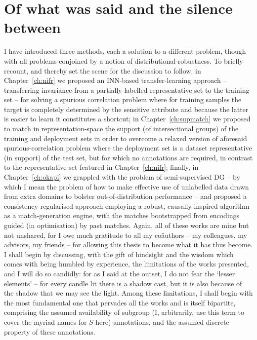 \section*{Of what was said and the silence between}\label{sec:what-was-said}
%
I have introduced three methods, each a solution to a different problem, though with all problems
conjoined by a notion of distributional-robustness.
%
%
To briefly recount, and thereby set the scene for the discussion to follow: in
Chapter~\ref{ch:nifr} we proposed an \ac{INN}-based transfer-learning approach -- transferring
invariance from a partially-labelled representative set to the training set -- for solving a
spurious correlation problem where for training samples the target is completely determined by the
sensitive attribute and because the latter is easier to learn it constitutes a shortcut;
%
in Chapter~\ref{ch:supmatch} we proposed to match in representation-space the support (of
intersectional groups) of the training and deployment sets in order to overcome a relaxed version
of aforesaid spurious-correlation problem where the deployment set is a dataset representative (in
support) of the test set, but for which no annotations are required, in contrast to the
representative set featured in Chapter~\ref{ch:nifr};
%
finally, in Chapter~\ref{ch:okapi} we grappled with the problem of semi-supervised \ac{DG} -- by
which I mean the problem of how to make effective use of unlabelled data drawn from extra domains
to bolster out-of-distribution performance -- and proposed a consistency-regularised approach
employing a robust, causally-inspired algorithm as a match-generation engine, with the matches
bootstrapped from encodings guided (in optimisation) by past matches.
%
Again, all of these works are mine but not unshared, for I owe much gratitude to all my
co{\"a}uthors -- my colleagues, my advisors, my friends -- for allowing this thesis to become what
it has thus become.
%
%
I shall begin by discussing, with the gift of hindsight and the wisdom which comes with being
humbled by experience, the limitations of the works presented, and I will do so candidly: for as I
said at the outset, I do not fear the `lesser elements' -- for every candle lit there is a shadow
cast, but it is also because of the shadow that we may see the light.
%
Among these limitations, I shall begin with the most fundamental one that pervades all the works
and is itself bipartite, comprising the assumed availability of subgroup (I, arbitrarily, use this
term to cover the myriad names for \(S\) here) annotations, and the assumed discrete property of
these annotations.

